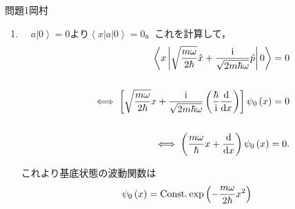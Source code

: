 \documentclass[fleqn]{jbook}
\begin{document}
\begin{answer}{問題1}{岡村}
\begin{enumerate}
  の形に書かれる。\\
  　$a,a^{\dagger}$の物理的意味については次の通り。調和振動子の$n~(=1,2,\dots)$番目のエネルギー固有値を$E_n$，これに属する固有状態を$\left| n \right\rangle$としたとき，$\left| n \right\rangle$に$a$を作用させた状態$a\left| n \right\rangle$は，固有値$E_n-\hbar\omega$を持った調和振動子のエネルギー固有状態となり，また$\left| n \right\rangle$に$a^{\dagger}$を作用させた状態$a^{\dagger}\left| n \right\rangle$は，固有値$E_n+\hbar\omega$を持った調和振動子のエネルギー固有状態となる。このように調和振動子のエネルギー固有状態に作用したとき，エネルギー$\hbar\omega$を持つ量子をそれぞれ消滅，生成する意味で，$a,a^{\dagger}$はそれぞれ消滅演算子，生成演算子と呼ばれる。また，ハミルトニアンの表式$(5)$に現れた$a^{\dagger}a \equiv \hat N$は個数演算子と呼ばれ，$\hat N \left(a^{\dagger}\right)^n \left| 0 \right\rangle= n\left(a^{\dagger}\right)^n \left| 0 \right\rangle$が成り立つことから，$\hat N$の固有値は調和振動子の基底状態の上に励起しているエネルギー量子$\hbar\omega$の数を表す。\\
  
  
  
  \item 　$a\left| 0 \right\rangle  = 0$より$\left\langle {x\left| a \right|0} \right\rangle  = 0$。これを計算して，
  \begin{eqnarray}
   & & \left\langle {x\left| {\sqrt {\frac{{m\omega }}{{2\hbar }}} \hat x + \frac{{\rm i}}{{\sqrt {2m\hbar \omega } }}\hat p} \right|0} \right\rangle  = 0 \cr 
   & & \cr
   & & \iff \left[ {\sqrt {\frac{{m\omega }}{{2\hbar }}} x + \frac{{\rm i}}{{\sqrt {2m\hbar \omega } }}\left( {\frac{\hbar }{{\rm i}}\frac{{\rm d}}{{{\rm d}x}}} \right)} \right]\psi _0 \left( x \right) = 0 \cr 
   & & \cr
   & & \iff \left( {\frac{{m\omega }}{\hbar }x + \frac{{\rm d}}{{{\rm d}x}}} \right)\psi _0 \left( x \right) = 0. 
  \end{eqnarray}
  
  これより基底状態の波動関数は
  \begin{equation}
  \psi _0 \left( x \right) = {\rm Const.} \exp \left( { - \frac{{m\omega }}{{2\hbar }}x^2 } \right)  
  \end{equation}
  

\end{enumerate}
\end{answer}
\end{document}
